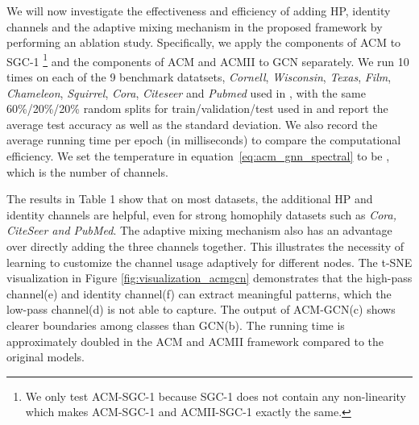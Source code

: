 \documentclass{article}
\newcommand{\0}{{\boldsymbol{0}}}
\newcommand{\6}{{\partial}}
\newcommand{\8}{{\infty}}
\newcommand{\4}{{\nabla}}
\def\eqref#1{equation~\ref{#1}}
\begin{document}
%
 We will now investigate the effectiveness and efficiency of adding HP, identity channels and the adaptive mixing mechanism in the proposed framework by performing an ablation study. Specifically, we apply the components of ACM to SGC-1 \cite{wu2019simplifying} \footnote{We only test ACM-SGC-1 because SGC-1 does not contain any non-linearity which makes ACM-SGC-1 and ACMII-SGC-1 exactly the same.} and the components of ACM and ACMII to GCN \cite{kipf2016classification} separately. We run 10 times on each of the 9 benchmark datatsets, \textit{Cornell}, \textit{Wisconsin}, \textit{Texas}, \textit{Film}, \textit{Chameleon}, \textit{Squirrel}, \textit{Cora}, \textit{Citeseer} and \textit{Pubmed} used in \cite{musae,pei2020geom}, with the same 60\%/20\%/20\% random splits for train/validation/test used in \cite{chien2021adaptive} and report the average test accuracy as well as the standard deviation. We also record the average running time per epoch (in milliseconds) to compare the computational efficiency. We set the temperature  in \eqref{eq:acm_gnn_spectral} to be , which is the number of channels. 

The results in Table 1 show that on most datasets, the additional HP and identity channels are helpful, even for strong homophily datasets such as \textit{Cora, CiteSeer and PubMed}. The adaptive mixing mechanism also has an advantage over directly adding the three channels together. This illustrates the necessity of learning to customize the channel usage adaptively for different nodes. The t-SNE visualization in Figure \ref{fig:visualization_acmgcn} demonstrates that the high-pass channel(e) and identity channel(f) can extract meaningful patterns, which the low-pass channel(d) is not able to capture. The output of ACM-GCN(c) shows clearer boundaries among classes than GCN(b). The running time is approximately doubled in the ACM and ACMII framework compared to the original models.
\end{document}
